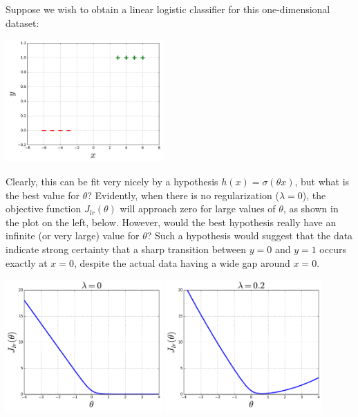 Suppose we wish to obtain a linear logistic classifier for this one-dimensional dataset:

\centerline{\includegraphics[width=0.45\textwidth]{figures/linear_logistic_classifier_and_regularization_data}}

%
\noindent
Clearly, this can be fit very nicely by a hypothesis
$h(x)=\sigma(\theta x)$, but what is the best value for $\theta$?
Evidently, when there is no regularization ($\lambda=0$), the objective function $J_{lr}(\theta)$ will approach zero for large
values of $\theta$, as shown in the plot on the left, below.
However, would the best hypothesis really have an infinite (or very
large) value for $\theta$?  Such a hypothesis would suggest that the
data indicate strong certainty that a sharp transition between $y=0$
and $y=1$ occurs exactly at $x=0$, despite the actual data having a wide
gap around $x=0$.
%
\centerline{\includegraphics[width=0.45\textwidth]{figures/linear_logistic_classifier_and_regularization_objective_noreg}
  \includegraphics[width=0.45\textwidth]{figures/linear_logistic_classifier_and_regularization_objective_withreg}
}
%

